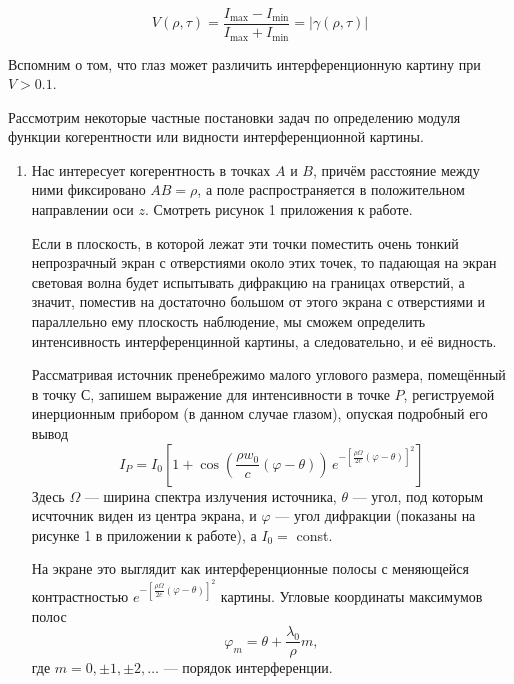 \documentclass[12pt]{article}
\begin{document}
\begin{equation}
	V(\rho, \tau) = \frac{I_\text{max} - I_\text{min}}{I_\text{max} + I_\text{min}} = |\gamma(\rho, \tau)|
\end{equation}
\par
	Вспомним о том, что глаз может различить интерференционную картину при $V > 0.1$.
\par
	Рассмотрим некоторые частные постановки задач по определению модуля функции когерентности или видности интерференционной картины.
\begin{enumerate}
	\item
		\par
			Нас интересует когерентность в точках $A$ и $B$, причём расстояние между ними фиксировано $AB = \rho$, а поле распространяется в положительном направлении оси $z$. Смотреть рисунок 1 приложения к работе.
		\par
			Если в плоскость, в которой лежат эти точки поместить очень тонкий непрозрачный экран с отверстиями около этих точек, то падающая на экран световая волна будет испытывать дифракцию на границах отверстий, а значит, поместив на достаточно большом от этого экрана с отверстиями и параллельно ему плоскость наблюдение, мы сможем определить интенсивность интерференцинной картины, а следовательно, и её видность.
		\par
			Рассматривая источник пренебрежимо малого углового размера, помещённый в точку С,  запишем выражение для интенсивности в точке $P$, региструемой инерционным прибором (в данном случае глазом), опуская подробный его вывод
\begin{equation}
	I_P = I_0 \left[1 + \cos\left(\frac{\rho w_0}{c} \left(\varphi - \theta\right) \right) \, e^{-\left[\frac{\rho \Omega}{2 c} \left(\varphi - \theta\right) \right]^2} \right]
\end{equation}
		Здесь $\Omega$ --- ширина спектра излучения источника, $\theta$ --- угол, под которым исчточник виден из центра экрана, и $\varphi$ --- угол дифракции (показаны на рисунке 1 в приложении к работе), а $I_0 = $ const.
		\par
			На экране это выглядит как интерференционные полосы с меняющейся контрастностью $e^{-\left[\frac{\rho \Omega}{2 c} \left(\varphi - \theta\right) \right]^2}$ картины. Угловые координаты максимумов полос
\begin{equation}
	\varphi_m = \theta + \frac{\lambda_0}{\rho}m,
\end{equation}
	где $m = 0, \pm 1, \pm 2, \dots$ --- порядок интерференции.
		\par

\end{enumerate}
\end{document}
